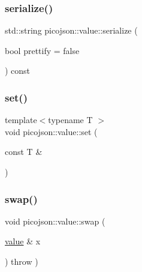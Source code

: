 \hypertarget{classpicojson_1_1value_ad5fa91c040826e85855678db9258238d}{}\label{classpicojson_1_1value_ad5fa91c040826e85855678db9258238d} 
\subsubsection{\texorpdfstring{serialize()}{serialize()}\hspace{0.1cm}{\footnotesize\ttfamily [2/2]}}
{\footnotesize\ttfamily std\+::string picojson\+::value\+::serialize (\begin{DoxyParamCaption}\item[{bool}]{prettify = {\ttfamily false} }\end{DoxyParamCaption}) const\hspace{0.3cm}{\ttfamily [inline]}}

\hypertarget{classpicojson_1_1value_a5349fff183e52146f2835d7fa0a10358}{}\label{classpicojson_1_1value_a5349fff183e52146f2835d7fa0a10358} 
\subsubsection{\texorpdfstring{set()}{set()}}
{\footnotesize\ttfamily template$<$typename T $>$ \\
void picojson\+::value\+::set (\begin{DoxyParamCaption}\item[{const T \&}]{ }\end{DoxyParamCaption})}

\hypertarget{classpicojson_1_1value_a6e3ac589ed811603ef9dadc6f91c737d}{}\label{classpicojson_1_1value_a6e3ac589ed811603ef9dadc6f91c737d} 
\subsubsection{\texorpdfstring{swap()}{swap()}}
{\footnotesize\ttfamily void picojson\+::value\+::swap (\begin{DoxyParamCaption}\item[{\hyperlink{classpicojson_1_1value}{value} \&}]{x }\end{DoxyParamCaption}) throw  ) \hspace{0.3cm}{\ttfamily [inline]}}

